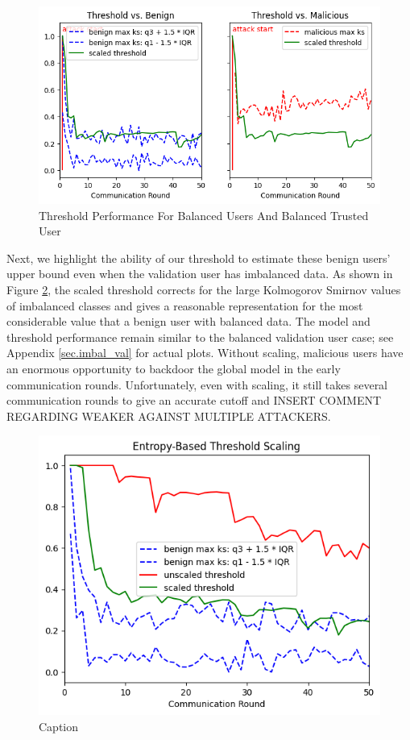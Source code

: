 \documentclass{article} %
\begin{document}
\begin{figure}[H]
    \centering
    \includegraphics[width=.75\textwidth]{centralized/alpha10000--alpha_val10000/visuals/threshold--n_malicious1--m_start1--d_rounds50.png}
    \caption{Threshold Performance For Balanced Users And Balanced Trusted User}
    \label{fig:centralized--alpha10000--alpha_val10000--threshold--n_malicious1--m_start1--d_rounds50}
\end{figure}

Next, we highlight the ability of our threshold to estimate these benign users' upper bound even when the validation user has imbalanced data. As shown in Figure \ref{fig:centralized--alpha10000--alpha_val1--scaling--d_rounds50.png}, the scaled threshold corrects for the large Kolmogorov Smirnov values of imbalanced classes and gives a reasonable representation for the most considerable value that a benign user with balanced data. The model and threshold performance remain similar to the balanced validation user case; see Appendix \ref{sec.imbal_val} for actual plots. Without scaling, malicious users have an enormous opportunity to backdoor the global model in the early communication rounds. Unfortunately, even with scaling, it still takes several communication rounds to give an accurate cutoff and INSERT COMMENT REGARDING WEAKER AGAINST MULTIPLE ATTACKERS.

\begin{figure}[H]
    \centering
    \includegraphics[width=.5\textwidth]{centralized/alpha10000--alpha_val1/visuals/scaling--n_malicious1--m_start1--d_rounds50.png}
    \caption{Caption}
    \label{fig:centralized--alpha10000--alpha_val1--scaling--d_rounds50.png}
\end{figure}
\end{document}
